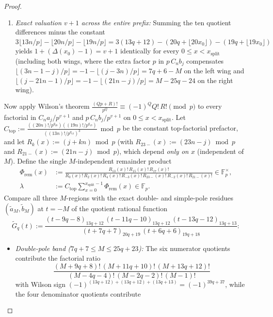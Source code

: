 \documentclass[11pt,reqno]{amsart}
\theoremstyle{definition}
\theoremstyle{remark}
\newcommand{\FF}{\mathbb{F}}
\begin{document}
\begin{proof}
\begin{enumerate}
  \item \emph{Exact valuation $v + 1$ across the entire prefix:} Summing the ten quotient differences minus the constant $3\lfloor 13n/p\rfloor - \lfloor 20n/p\rfloor - \lfloor 19n/p\rfloor = 3(13q+12) - (20q + \lfloor 20x_0 \rfloor) - (19q + \lfloor 19x_0 \rfloor)$ yields $1 + (\Delta(x_0) - 1) = v + 1$ identically for every $0 \le x < x_{\mathrm{split}}$ (including both wings, where the extra factor $p$ in $p\,C_n b_j$ compensates $\lfloor (3n - 1 - j)/p \rfloor = -1 - \lfloor (j - 3n)/p \rfloor = 7q + 6 - M$ on the left wing and $\lfloor (j - 21n - 1)/p \rfloor = -1 - \lfloor (21n - j)/p \rfloor = M - 25q - 24$ on the right wing).
\end{enumerate}

Now apply Wilson's theorem $\frac{(Qp+R)!}{p^Q} \equiv (-1)^Q Q!\,R! \pmod p$ to every factorial in $C_n a_j / p^{v+1}$ and $p\,C_n b_j / p^{v+1}$ on $0 \le x < x_{\mathrm{split}}$. Let $C_{\mathrm{top}} := \frac{((20n)!/p^{q_{20}})((19n)!/p^{q_{19}})}{((13n)!/p^{q_{13}})^3} \bmod p$ be the constant top-factorial prefactor, and let $R_k(x) := (j + kn) \bmod p$ (with $R_{23-}(x) := (23n - j) \bmod p$ and $R_{21-}(x) := (21n - j) \bmod p$), which depend \emph{only on $x$} (independent of $M$). Define the single $M$-independent remainder product
\begin{align*}
  \Phi_{\mathrm{rem}}(x)
  &:= \frac{R_{13}(x)!\,R_{15}(x)!\,R_{17}(x)!}
          {R_0(x)!\,R_2(x)!\,R_4(x)!\,R_{-3}(x)!\,R_{23-}(x)!\,R_{-2}(x)!\,R_{21-}(x)!} \in \FF_p^\times, \\
  \lambda &:= C_{\mathrm{top}} \sum_{x=0}^{x_{\mathrm{split}}-1} \Phi_{\mathrm{rem}}(x) \in \FF_p.
\end{align*}
Compare all three $M$-regions with the exact double- and simple-pole residues $(\widetilde{a}_M, \widetilde{b}_M)$ at $t = -M$ of the quotient rational function
\begin{equation}
\label{eq:G-tilde}
  \widetilde{G}_q(t)
  := \frac{(t - 9q - 8)_{13q + 12}\,(t - 11q - 10)_{13q + 12}\,(t - 13q - 12)_{13q + 13}}
          {(t + 7q + 7)_{20q + 19}\,(t + 6q + 6)_{19q + 18}}:
\end{equation}
\begin{itemize}
  \item \emph{Double-pole band ($7q + 7 \le M \le 25q + 23$):} The six numerator quotients contribute the factorial ratio
  \[
    \frac{(M+9q+8)!\,(M+11q+10)!\,(M+13q+12)!}{(M-4q-4)!\,(M-2q-2)!\,(M-1)!}
  \]
  with Wilson sign $(-1)^{(13q+12)+(13q+12)+(13q+13)} = (-1)^{39q+37}$, while the four denominator quotients contribute

\end{itemize}
\end{proof}
\end{document}
